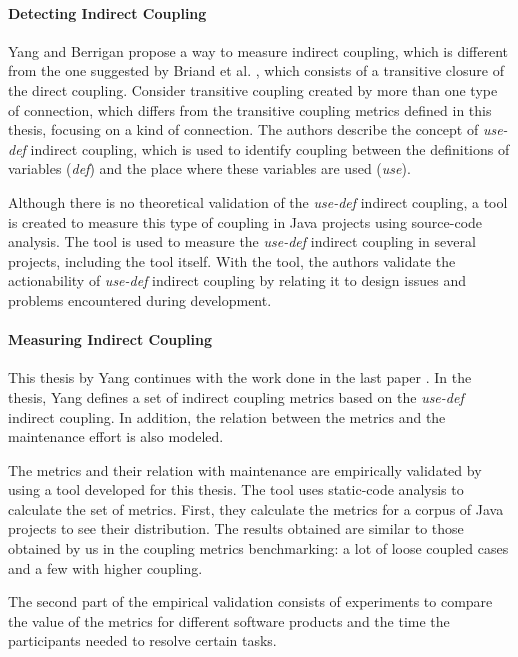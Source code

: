 \paragraph{Detecting Indirect Coupling \cite{yang2005detecting}}

Yang and Berrigan propose a way to measure indirect coupling, which is different from the one suggested by Briand et al. \cite{briand1999unified}, which consists of a transitive closure of the direct coupling. Consider transitive coupling created by more than one type of connection, which differs from the transitive coupling metrics defined in this thesis, focusing on a kind of connection. The authors describe the concept of \textit{use-def} indirect coupling, which is used to identify coupling between the definitions of variables (\textit{def}) and the place where these variables are used (\textit{use}).

Although there is no theoretical validation of the \textit{use-def} indirect coupling, a tool is created to measure this type of coupling in Java projects using source-code analysis. The tool is used to measure the \textit{use-def} indirect coupling in several projects, including the tool itself. With the tool, the authors validate the actionability of \textit{use-def} indirect coupling by relating it to design issues and problems encountered during development.

\paragraph{Measuring Indirect Coupling \cite{Yang2010}}

This thesis by Yang continues with the work done in the last paper \cite{yang2005detecting}. In the thesis, Yang defines a set of indirect coupling metrics based on the \textit{use-def} indirect coupling. In addition, the relation between the metrics and the maintenance effort is also modeled.

The metrics and their relation with maintenance are empirically validated by using a tool developed for this thesis. The tool uses static-code analysis to calculate the set of metrics. First, they calculate the metrics for a corpus of Java projects to see their distribution. The results obtained are similar to those obtained by us in the coupling metrics benchmarking: a lot of loose coupled cases and a few with higher coupling.

The second part of the empirical validation consists of experiments to compare the value of the metrics for different software products and the time the participants needed to resolve certain tasks.

